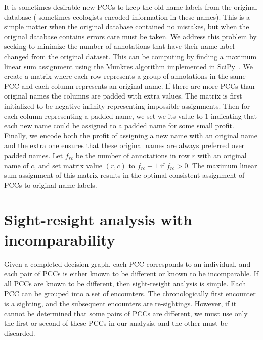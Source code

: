 \begin{appendices}
It is sometimes desirable new PCCs to keep the old name labels from the original database (\eg{} sometimes
ecologists encoded information in these names). This is a simple matter when the original database contained no
mistakes, but when the original database contains errors care must be taken. We address this problem by seeking to
minimize the number of annotations that have their name label changed from the original dataset. This can be
computing by finding a maximum linear sum assignment using the Munkres algorithm implemented in
SciPy~\cite{eric_jones_scipy_2001}. We create a matrix where each row represents a group of annotations in the same
PCC and each column represents an original name. If there are more PCCs than original names the columns are padded
with extra values. The matrix is first initialized to be negative infinity representing impossible assignments.
Then for each column representing a padded name, we set we its value to $1$ indicating that each new name could be
assigned to a padded name for some small profit. Finally, we encode both the profit of assigning a new name with an
original name and the extra one ensures that these original names are always preferred over padded names. Let
$f_{rc}$ be the number of annotations in row $r$ with an original name of $c$, and set matrix value %
$(r, c)$ to $f_{rc} + 1$ if $f_{rc} > 0$. The maximum linear sum assignment of this matrix results in the optimal
consistent assignment of PCCs to original name labels.
  

\chapter{Sight-resight analysis with incomparability}\label{app:markrecapincomp}

Given a completed decision graph, each PCC corresponds to an individual, and each pair of PCCs is either known to
  be different or known to be incomparable.
If all PCCs are known to be different, then sight-resight analysis is simple.
Each PCC can be grouped into a set of encounters.
The chronologically first encounter is a sighting, and the subsequent encounters are re-sightings.
However, if it cannot be determined that some pairs of PCCs are different, we must use only the first or second
  of these PCCs in our analysis, and the other must be discarded.


\end{appendices}
